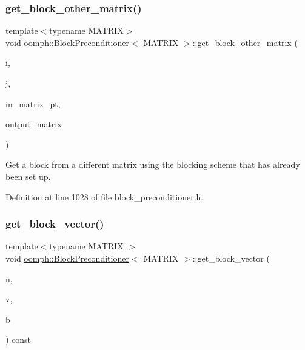 \subsubsection{\texorpdfstring{get\+\_\+block\+\_\+other\+\_\+matrix()}{get\_block\_other\_matrix()}}
{\footnotesize\ttfamily template$<$typename M\+A\+T\+R\+IX$>$ \\
void \hyperlink{classoomph_1_1BlockPreconditioner}{oomph\+::\+Block\+Preconditioner}$<$ M\+A\+T\+R\+IX $>$\+::get\+\_\+block\+\_\+other\+\_\+matrix (\begin{DoxyParamCaption}\item[{const unsigned \&}]{i,  }\item[{const unsigned \&}]{j,  }\item[{M\+A\+T\+R\+IX $\ast$}]{in\+\_\+matrix\+\_\+pt,  }\item[{M\+A\+T\+R\+IX \&}]{output\+\_\+matrix }\end{DoxyParamCaption})\hspace{0.3cm}{\ttfamily [inline]}}



Get a block from a different matrix using the blocking scheme that has already been set up. 



Definition at line 1028 of file block\+\_\+preconditioner.\+h.

\mbox{\label{classoomph_1_1BlockPreconditioner_a7efc9f2f0209764902e4e45fcb2556d1}} 
\subsubsection{\texorpdfstring{get\+\_\+block\+\_\+vector()}{get\_block\_vector()}}
{\footnotesize\ttfamily template$<$typename M\+A\+T\+R\+IX $>$ \\
void \hyperlink{classoomph_1_1BlockPreconditioner}{oomph\+::\+Block\+Preconditioner}$<$ M\+A\+T\+R\+IX $>$\+::get\+\_\+block\+\_\+vector (\begin{DoxyParamCaption}\item[{const unsigned \&}]{n,  }\item[{const \hyperlink{classoomph_1_1DoubleVector}{Double\+Vector} \&}]{v,  }\item[{\hyperlink{classoomph_1_1DoubleVector}{Double\+Vector} \&}]{b }\end{DoxyParamCaption}) const}



